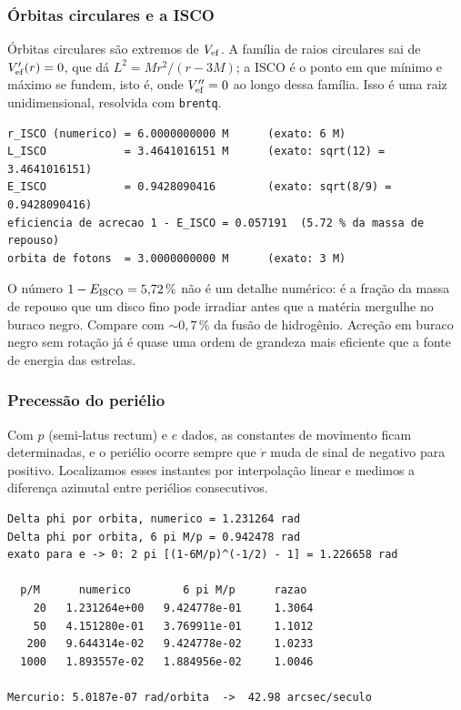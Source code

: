 \subsubsection*{Órbitas circulares e a ISCO}

Órbitas circulares são extremos de $V_{\mathrm{ef}}$. A família de raios circulares sai
de $V_{\mathrm{ef}}'(r)=0$, que dá $L^{2} = Mr^{2}/(r-3M)$; a ISCO é o ponto em que
mínimo e máximo se fundem, isto é, onde $V_{\mathrm{ef}}''=0$ ao longo dessa família.
Isso é uma raiz unidimensional, resolvida com \texttt{brentq}.

\begin{saida}
\begin{lstlisting}[style=rgsaida]
r_ISCO (numerico) = 6.0000000000 M      (exato: 6 M)
L_ISCO            = 3.4641016151 M      (exato: sqrt(12) = 3.4641016151)
E_ISCO            = 0.9428090416        (exato: sqrt(8/9) = 0.9428090416)
eficiencia de acrecao 1 - E_ISCO = 0.057191  (5.72 % da massa de repouso)
orbita de fotons  = 3.0000000000 M      (exato: 3 M)
\end{lstlisting}
\end{saida}

\begin{central}
O número $1-E_{\rm ISCO} = 5{,}72\,\%$ não é um detalhe numérico: é a fração
da massa de repouso que um disco fino pode irradiar antes que a matéria
mergulhe no buraco negro. Compare com $\sim 0{,}7\,\%$ da fusão de hidrogênio.
Acreção em buraco negro sem rotação já é quase uma ordem de grandeza mais
eficiente que a fonte de energia das estrelas.
\end{central}

\subsubsection*{Precessão do periélio}

Com $p$ (semi-latus rectum) e $e$ dados, as constantes de movimento ficam
determinadas, e o periélio ocorre sempre que $\dot r$ muda de sinal de
negativo para positivo. Localizamos esses instantes por interpolação linear e
medimos a diferença azimutal entre periélios consecutivos.

\begin{saida}
\begin{lstlisting}[style=rgsaida]
Delta phi por orbita, numerico = 1.231264 rad
Delta phi por orbita, 6 pi M/p = 0.942478 rad
exato para e -> 0: 2 pi [(1-6M/p)^(-1/2) - 1] = 1.226658 rad

  p/M      numerico        6 pi M/p      razao
    20   1.231264e+00   9.424778e-01     1.3064
    50   4.151280e-01   3.769911e-01     1.1012
   200   9.644314e-02   9.424778e-02     1.0233
  1000   1.893557e-02   1.884956e-02     1.0046

Mercurio: 5.0187e-07 rad/orbita  ->  42.98 arcsec/seculo
\end{lstlisting}
\end{saida}

